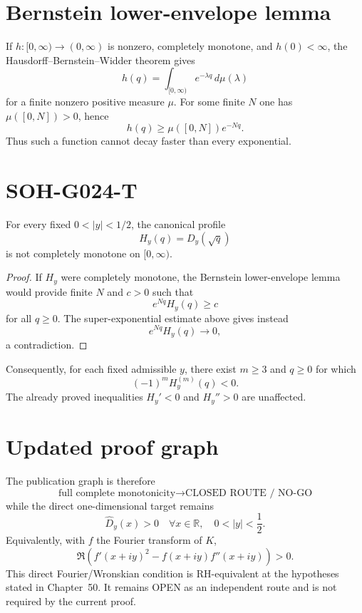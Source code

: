\section{Bernstein lower-envelope lemma}
If $h:[0,\infty)\to(0,\infty)$ is nonzero, completely monotone, and $h(0)<\infty$, the Hausdorff--Bernstein--Widder theorem gives
\[
h(q)=\int_{[0,\infty)}e^{-\lambda q}\,d\mu(\lambda)
\]
for a finite nonzero positive measure $\mu$. For some finite $N$ one has $\mu([0,N])>0$, hence
\[
\boxed{h(q)\ge \mu([0,N])e^{-Nq}.}
\]
Thus such a function cannot decay faster than every exponential.

\section{SOH-G024-T}
\begin{theorem}
For every fixed $0<|y|<1/2$, the canonical profile
\[
H_y(q)=D_y(\sqrt q)
\]
is not completely monotone on $[0,\infty)$.
\end{theorem}

\begin{proof}
If $H_y$ were completely monotone, the Bernstein lower-envelope lemma would provide finite $N$ and $c>0$ such that
\[
e^{Nq}H_y(q)\ge c
\]
for all $q\ge0$. The super-exponential estimate above gives instead
\[
e^{Nq}H_y(q)\longrightarrow0,
\]
a contradiction.
\end{proof}

Consequently, for each fixed admissible $y$, there exist $m\ge3$ and $q\ge0$ for which
\[
\boxed{(-1)^mH_y^{(m)}(q)<0.}
\]
The already proved inequalities $H_y'<0$ and $H_y''>0$ are unaffected.

\section{Updated proof graph}
The publication graph is therefore
\[
\boxed{
\text{full complete monotonicity}
\longrightarrow
\text{CLOSED ROUTE / NO-GO}
}
\]
while the direct one-dimensional target remains
\[
\boxed{\widehat D_y(x)>0
\quad\forall x\in\mathbb R,
\quad0<|y|<\frac12.}
\]
Equivalently, with $f$ the Fourier transform of $K$,
\[
\boxed{\Re\!\left(f'(x+iy)^2-f(x+iy)f''(x+iy)\right)>0.}
\]
This direct Fourier/Wronskian condition is RH-equivalent at the hypotheses stated in Chapter~50. It remains OPEN as an independent route and is not required by the current proof.

